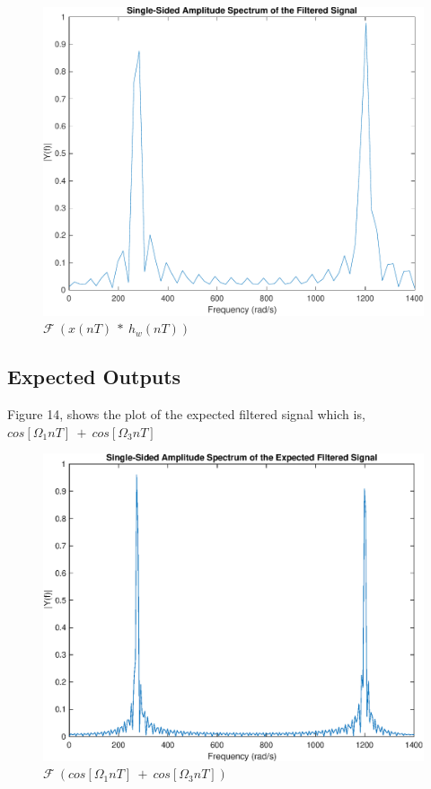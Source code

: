 \documentclass[11pt]{article}
\begin{document}
\begin{figure}[H]
    \centering
    \includegraphics[scale=0.7]{filtered_mag} 
    \caption{$\mathscr{F} \ ( x( nT) \ *\ h_{w}( nT))$}
\end{figure}

\subsection{Expected Outputs}
Figure 14, shows the plot of the expected filtered signal which is, $ cos[ \Omega _{1} nT] \ +\ cos[ \Omega _{3} nT]$

\begin{figure}[H]
    \centering
    \includegraphics[scale=0.7]{efs.eps} 
    \caption{$\mathscr{F} \ ( cos[ \Omega _{1} nT] \ +\ cos[ \Omega _{3} nT])$}
\end{figure}
\end{document}

